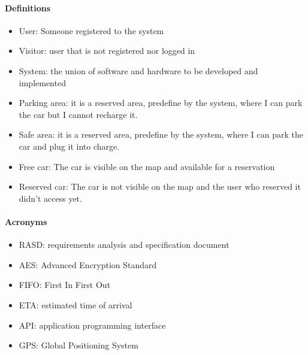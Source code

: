 \paragraph{Definitions}
\begin{itemize}
	\item User: Someone registered to the system
	\item Visitor: user that is not registered nor logged in
	\item System: the union of software and hardware to be developed and implemented
	\item Parking area: it is a reserved area, predefine by the system, where I can park the car but I cannot recharge it.
	\item Safe area: it is a reserved area, predefine by the system, where I can park the car and plug it into charge.
	\item Free car: The car is visible on the map and available for a reservation
	\item Reserved car: The car is not visible on the map and the user who reserved it didn't access yet.
\end{itemize}
\paragraph{Acronyms}
\begin{itemize}
	\item RASD: requirements analysis and specification document
	\item AES: Advanced Encryption Standard
	\item FIFO: First In First Out
	\item ETA: estimated time of arrival
	\item API: application programming interface
	\item GPS: Global Positioning System
\end{itemize}